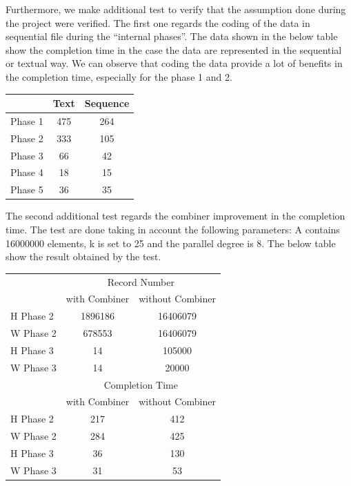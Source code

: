 Furthermore, we make additional test to verify that the assumption done during the project were verified. The first one regards the coding of the data in sequential file during the ``internal phases''. The data shown in the below table show the completion time in the case the data are represented in the sequential or textual way. We can observe that coding the data provide a lot of benefits in the completion time, especially for the phase 1 and 2.

\begin{center}
\begin{tabular}{ | l || c | c | }
  \hline      
  & Text & Sequence \\
  \hline      
  Phase 1 & 475 & 264 \\
  Phase 2 & 333 & 105 \\
  Phase 3 & 66 & 42 \\ 
  Phase 4 & 18 & 15 \\
  Phase 5 & 36 & 35 \\
  \hline  
\end{tabular}
\end{center}

The second additional test regards the combiner improvement in the completion time. The test are done taking in account the following parameters: A contains 16000000 elements, k is set to 25 and the parallel degree is 8. The below table show the result obtained by the test.

\begin{center}
\label{comb_table}
\begin{tabular}{ | l || c | c | }
  \hline      
  & \multicolumn{2}{|c|}{Record Number} \\
  & with Combiner & without Combiner \\
  \hline      
  H Phase 2 & 1896186 & 16406079 \\
  W Phase 2 & 678553 & 16406079 \\ 
  H Phase 3 & 14 & 105000 \\ 
  W Phase 3 & 14 & 20000 \\ 
 \hline  
  \hline      
  & \multicolumn{2}{|c|}{Completion Time} \\
  & with Combiner & without Combiner \\
  \hline      
  H Phase 2 & 217 & 412 \\
  W Phase 2 & 284 & 425 \\ 
  H Phase 3 & 36 & 130 \\ 
  W Phase 3 & 31 & 53 \\ 
 \hline  
\end{tabular}

\end{center}














